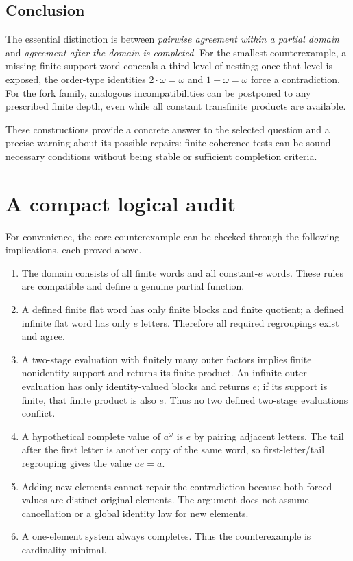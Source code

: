\documentclass[11pt,letterpaper]{article}
\numberwithin{equation}{section}
\theoremstyle{definition}
\theoremstyle{remark}
\begin{document}
\subsection{Conclusion}
The essential distinction is between \emph{pairwise agreement within a partial domain} and \emph{agreement after the domain is completed}. For the smallest counterexample, a missing finite-support word conceals a third level of nesting; once that level is exposed, the order-type identities $2\cdot\omega=\omega$ and $1+\omega=\omega$ force a contradiction. For the fork family, analogous incompatibilities can be postponed to any prescribed finite depth, even while all constant transfinite products are available.

These constructions provide a concrete answer to the selected question and a precise warning about its possible repairs: finite coherence tests can be sound necessary conditions without being stable or sufficient completion criteria.

\appendix
\section{A compact logical audit}
\label{app:audit}
For convenience, the core counterexample can be checked through the following implications, each proved above.
\begin{enumerate}[label=\arabic*.,leftmargin=*,itemsep=4pt]
\item The domain consists of all finite words and all constant-$e$ words. These rules are compatible and define a genuine partial function.
\item A defined finite flat word has only finite blocks and finite quotient; a defined infinite flat word has only $e$ letters. Therefore all required regroupings exist and agree.
\item A two-stage evaluation with finitely many outer factors implies finite nonidentity support and returns its finite product. An infinite outer evaluation has only identity-valued blocks and returns $e$; if its support is finite, that finite product is also $e$. Thus no two defined two-stage evaluations conflict.
\item A hypothetical complete value of $a^\omega$ is $e$ by pairing adjacent letters. The tail after the first letter is another copy of the same word, so first-letter/tail regrouping gives the value $ae=a$.
\item Adding new elements cannot repair the contradiction because both forced values are distinct original elements. The argument does not assume cancellation or a global identity law for new elements.
\item A one-element system always completes. Thus the counterexample is cardinality-minimal.
\end{enumerate}
\end{document}
